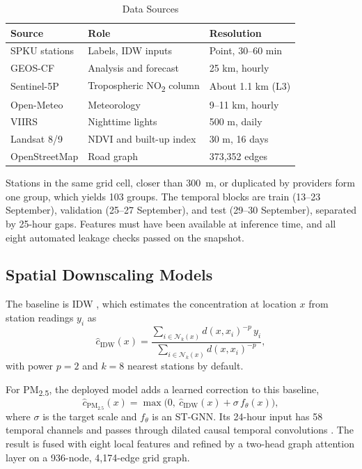 \documentclass[conference]{IEEEtran}
\newcommand{\pmtf}{PM\textsubscript{2.5}}
\newcommand{\notwo}{NO\textsubscript{2}}
\begin{document}
\begin{table}[!t]
\caption{Data Sources}
\label{tab:data}
\centering
\footnotesize
\begin{tabular}{@{}p{}p{}p{}@{}}
\toprule
\textbf{Source} & \textbf{Role} & \textbf{Resolution} \\
\midrule
SPKU stations & Labels, IDW inputs & Point, 30--60 min \\
GEOS-CF \cite{keller2021} & Analysis and forecast & 25 km, hourly \\
Sentinel-5P \cite{veefkind2012} & Tropospheric \notwo{} column & About 1.1 km (L3) \\
Open-Meteo & Meteorology & 9--11 km, hourly \\
VIIRS \cite{roman2018} & Nighttime lights & 500 m, daily \\
Landsat 8/9 & NDVI and built-up index & 30 m, 16 days \\
OpenStreetMap \cite{haklay2008} & Road graph & 373,352 edges \\
\bottomrule
\end{tabular}
\end{table}

Stations in the same grid cell, closer than 300~m, or duplicated by providers form one group, which yields 103 groups. The temporal blocks are train (13--23 September), validation (25--27 September), and test (29--30 September), separated by 25-hour gaps. Features must have been available at inference time, and all eight automated leakage checks passed on the snapshot.

\subsection{Spatial Downscaling Models}

The baseline is IDW \cite{shepard1968}, which estimates the concentration at location $x$ from station readings $y_i$ as
\begin{equation}
\hat{c}_{\mathrm{IDW}}(x)=\frac{\sum_{i\in\mathcal{N}_k(x)}d(x,x_i)^{-p}\,y_i}{\sum_{i\in\mathcal{N}_k(x)}d(x,x_i)^{-p}},
\label{eq:idw}
\end{equation}
with power $p=2$ and $k=8$ nearest stations by default.

For \pmtf{}, the deployed model adds a learned correction to this baseline,
\begin{equation}
\hat{c}_{\mathrm{PM}_{2.5}}(x)=\max\bigl(0,\ \hat{c}_{\mathrm{IDW}}(x)+\sigma\,f_\theta(x)\bigr),
\label{eq:stgnn}
\end{equation}
where $\sigma$ is the target scale and $f_\theta$ is an ST-GNN. Its 24-hour input has 58 temporal channels and passes through dilated causal temporal convolutions \cite{bai2018}. The result is fused with eight local features and refined by a two-head graph attention layer \cite{velickovic2018} on a 936-node, 4,174-edge grid graph.
\end{document}
